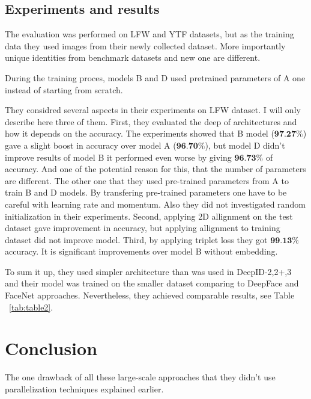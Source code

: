 \documentclass[paper=a4, fontsize=11pt]{scrartcl} %
\numberwithin{equation}{section} %
\numberwithin{figure}{section} %
\numberwithin{table}{section} %
\begin{document}
\subsection{Experiments and results}

The evaluation was performed on LFW and YTF datasets, but as the training data they used images from their newly collected dataset. More importantly unique identities from benchmark datasets and new one are different.\par
During the training proces, models B and D used pretrained parameters of A one instead of starting from scratch. \par
They considred several aspects in their experiments on LFW dataset. I will only describe here three of them. First, they evaluated the deep of architectures and how it depends on the accuracy. The experiments showed that B model ($\textbf{97.27}\%$) gave a slight boost in accuracy over model A ($\textbf{96.70}\%$), but model D didn't improve results of model B it performed even worse by giving $\textbf{96.73}\%$ of accuracy. And one of the potential reason for this, that the number of parameters are different. The other one that they used pre-trained parameters from A to train B and D models. By transfering pre-trained parameters one have to be careful with learning rate and momentum. Also they did not investigated random initialization in their experiments. Second, applying 2D allignment on the test dataset gave improvement in accuracy, but applying allignment to training dataset did not improve model. Third, by applying triplet loss they got $\textbf{99.13\%}$ accuracy. It is significant improvements over model B without embedding. \par
To sum it up, they used simpler architecture than was used in DeepID-2,2+,3 \cite{sun2014deep, sun2015deeply, sun2015deepid3} and their model was trained on the smaller dataset comparing to DeepFace and FaceNet approaches. Nevertheless, they achieved comparable results, see Table ~\ref{tab:table2}.
\newpage

\section{Conclusion}
The one drawback of all these large-scale approaches that they didn't use parallelization techniques explained earlier.

\newpage




\end{document}
